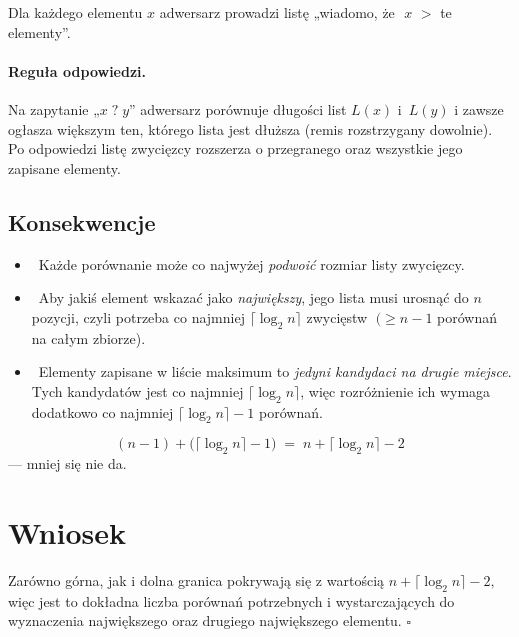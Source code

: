 \documentclass[11pt,a4paper]{article}
\begin{document}
Dla każdego elementu $x$ adwersarz prowadzi listę
„wiadomo, że~\,$x$ $>$ te elementy”.

\paragraph{Reguła odpowiedzi.}
Na zapytanie „$x\;?\;y$”
adwersarz porównuje długości list $L(x)$ i~$L(y)$
i zawsze ogłasza większym ten, którego lista jest dłuższa
(remis rozstrzygany dowolnie).
Po odpowiedzi listę zwycięzcy rozszerza o przegranego
oraz wszystkie jego zapisane elementy.

\subsection*{Konsekwencje}

\begin{itemize}
\item \
Każde porównanie może co najwyżej
\emph{podwoić} rozmiar listy zwycięzcy.
\item \
Aby jakiś element wskazać jako \emph{największy},
jego lista musi urosnąć do $n$ pozycji,
czyli potrzeba co najmniej
$\lceil\log_2 n\rceil$ zwycięstw $\;(\ge n-1$ porównań
na całym zbiorze).
\item \
Elementy zapisane w liście maksimum
to \emph{jedyni kandydaci na drugie miejsce}.
Tych kandydatów jest co najmniej
$\lceil\log_2 n\rceil$,
więc rozróżnienie ich wymaga dodatkowo
co najmniej
$\lceil\log_2 n\rceil-1$ porównań.
\end{itemize}

\[
  (n-1)
  +\bigl(\lceil\log_2 n\rceil-1\bigr)
  \;=\;
  n+\lceil\log_2 n\rceil-2
\]
— mniej się nie da.

\section*{Wniosek}

Zarówno górna, jak i dolna granica
pokrywają się z wartością
\(
  n+\lceil\log_2 n\rceil-2,
\)
więc jest to dokładna liczba
porównań potrzebnych i wystarczających
do wyznaczenia największego oraz
drugiego największego elementu.
\hfill$\square$
\end{document}
